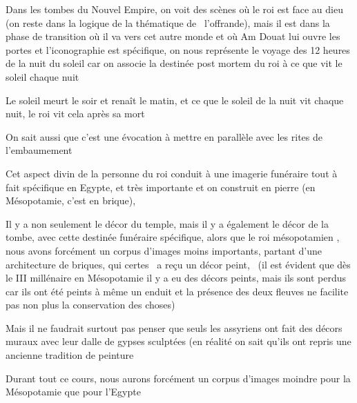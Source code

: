 \documentclass[a4paper]{article}
\begin{document}
{
Dans les tombes du Nouvel Empire, on voit des scènes où le roi est face
au dieu (on reste dans la logique de la thématique de \ l'offrande),
mais il est dans la phase de transition où il va vers cet autre monde
et où Am Douat lui ouvre les portes et l'iconographie est spécifique,
on nous représente le voyage des 12 heures de la nuit du soleil car on
associe la destinée post mortem du roi à ce que vit le soleil chaque
nuit}

{
Le soleil meurt le soir et renaît le matin, et ce que le soleil de la
nuit vit chaque nuit, le roi vit cela après sa mort}

{
On sait aussi que c'est une évocation à mettre en parallèle avec les
rites de l'embaumement}


\bigskip

{
Cet aspect divin de la personne du roi conduit à une imagerie funéraire
tout à fait spécifique en Egypte, et très importante et on construit en
pierre (en Mésopotamie, c'est en brique), }

{
Il y a non seulement le décor du temple, mais il y a également le décor
de la tombe, avec cette destinée funéraire spécifique, alors que le roi
mésopotamien , nous avons forcément un corpus d'images moins
importants, partant d'une architecture de briques, qui certes \ a reçu
un décor peint, \ (il est évident que dès le III millénaire en
Mésopotamie il y a eu des décors peints, mais ils sont perdus car ils
ont été peints à même un enduit et la présence des deux fleuves ne
facilite pas non plus la conservation des choses)}


\bigskip

{
Mais il ne faudrait surtout pas penser que seuls les assyriens ont fait
des décors muraux avec leur dalle de gypses sculptées (en réalité on
sait qu'ils ont repris une ancienne tradition de peinture}


\bigskip

{
Durant tout ce cours, nous aurons forcément un corpus d'images moindre
pour la Mésopotamie que pour l'Egypte}


\bigskip


\bigskip


\bigskip


\bigskip


\bigskip


\bigskip


\bigskip
\end{document}
